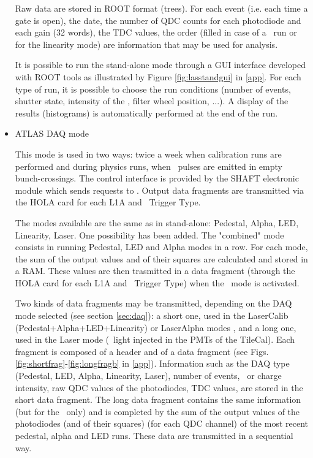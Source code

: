\begin{itemize}
Raw data are stored in ROOT \cite{ref:root} format (trees). For each event (i.e. each time a gate is open), the date, the number of QDC counts for each photodiode and each gain (32 words), the TDC values, the order (filled in case of a \laser~run or for the linearity mode) are information that may be used for analysis. 

It is possible to run the stand-alone mode through a GUI interface developed with ROOT tools as illustrated by Figure \ref{fig:lasstandgui} in \ref{app}. For each type of run, it is possible to choose the run conditions (number of events, shutter state, intensity of the \laser, filter wheel position, ...). A display of the results (histograms) is automatically performed at the end of the run.

\item ATLAS DAQ mode

This mode is used in two ways: twice a week when calibration runs are performed and during physics runs, when \laser~pulses are emitted in empty bunch-crossings. The control interface is provided by the SHAFT electronic module which sends requests to \lascar. Output data fragments are transmitted via the HOLA card for each L1A and \laser~Trigger Type.

The modes available are the same as in stand-alone: Pedestal, Alpha, LED, Linearity, Laser. One possibility has been added. The "combined" mode consists in running Pedestal, LED and Alpha modes in a row. For each mode, the sum of the output values and of their squares are calculated and stored in a RAM. These values are then trasmitted in a data fragment (through the HOLA card for each L1A and \laser~Trigger Type) when the \laser~mode is activated.

Two kinds of data fragments may be transmitted, depending on the DAQ mode selected (see section \ref{sec:daq}): a short one, used in the LaserCalib (Pedestal+Alpha+LED+Linearity) or LaserAlpha modes , and a long one, used in the Laser mode (\laser~light injected in the PMTs of the TileCal). Each fragment is composed of a header and of a data fragment (see Figs. \ref{fig:shortfrag}-\ref{fig:longfragb} in \ref{app}). Information such as the DAQ type (Pedestal, LED, Alpha, Linearity, Laser), number of events, \laser~or charge intensity, raw QDC values of the photodiodes, TDC values, are stored in the short data fragment. The long data fragment contains the same information (but for the \laser~only) and is completed by the sum of the output values of the photodiodes (and of their squares) (for each QDC channel) of the most recent pedestal, alpha and LED runs. These data are transmitted in a sequential way. 

\end{itemize}
